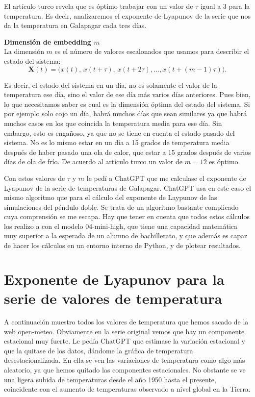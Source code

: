 \documentclass[
  10pt,
  a4paper,
  DIV=11,
  numbers=noendperiod,
  open=any]{scrreprt}
\numberwithin{equation}{chapter}
\numberwithin{equation}{section}
\renewcommand{\[}{\begin{equation}}
\renewcommand{\]}{\end{equation}}
\begin{document}
El artículo turco revela que es óptimo trabajar con un valor de \(\tau\)
igual a 3 para la temperatura. Es decir, analizaremos el exponente de
Lyapunov de la serie que nos da la temperatura en Galapagar cada tres
días.

\textbf{Dimensión de embedding \(m\)}\\
La dimensión \(m\) es el número de valores escalonados que usamos para
describir el estado del sistema:\\
\[
\mathbf X(t)=\bigl(x(t),\,x(t+\tau),\,x(t+2\tau),\dots,x(t+(m-1)\tau)\bigr).
\]

Es decir, el estado del sistema en un día, no es solamente el valor de
la temperatura ese día, sino el valor de ese día más varios días
anteriores. Pues bien, lo que necesitamos saber es cual es la dimensión
óptima del estado del sistema. Si por ejemplo solo cojo un día, habrá
muchos días que sean similares ya que habrá muchos casos en los que
coincida la temperatura media para ese día. Sin embargo, esto es
engañoso, ya que no se tiene en cuenta el estado pasado del sistema. No
es lo mismo estar en un día a 15 grados de temperatura media después de
haber pasado una ola de calor, que estar a 15 grados después de varios
días de ola de frío. De acuerdo al artículo turco un valor de \(m=12\)
es óptimo.

Con estos valores de \(\tau\) y \(m\) le pedí a ChatGPT que me calculase
el exponente de Lyapunov de la serie de temperaturas de Galapagar.
ChatGPT usa en este caso el mismo algoritmo que para el cálculo del
exponente de Laypunov de las simulaciones del péndulo doble. Se trata de
un algoritmo bastante complicado cuya comprensión se me escapa. Hay que
tener en cuenta que todos estos cálculos los realizo a con el modelo
04-mini-high, que tiene una capacidad matemática muy superior a la
esperada de un alumno de bachillerato, y que además es capaz de hacer
los cálculos en un entorno interno de Python, y de plotear resultados.

\section{Exponente de Lyapunov para la serie de valores de
temperatura}\label{exponente-de-lyapunov-para-la-serie-de-valores-de-temperatura}

A continuación muestro todos los valores de temperatura que hemos sacado
de la web open-meteo. Obviamente en la serie original vemos que hay un
componente estacional muy fuerte. Le pedía ChatGPT que estimase la
variación estacional y que la quitase de los datos, dándome la gráfica
de temperatura desestacionalizada. En ella se ven las variaciones de
temperatura como algo más aleatorio, ya que hemos quitado las
componentes estacionales. No obstante se ve una ligera subida de
temperaturas desde el año 1950 hasta el presente, coincidente con el
aumento de temperaturas observado a nivel global en la Tierra.
\end{document}
